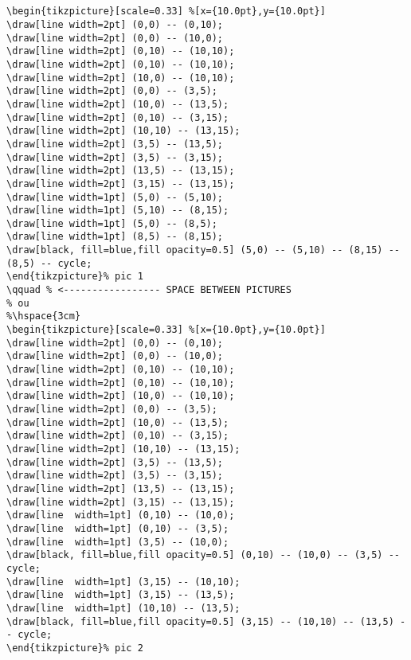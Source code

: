 \begin{lstlisting}[style=myLaTeX,caption=A cube with fixed 2d Coordinates]


\begin{tikzpicture}[scale=0.33] %[x={10.0pt},y={10.0pt}]
\draw[line width=2pt] (0,0) -- (0,10);
\draw[line width=2pt] (0,0) -- (10,0);
\draw[line width=2pt] (0,10) -- (10,10);
\draw[line width=2pt] (0,10) -- (10,10);
\draw[line width=2pt] (10,0) -- (10,10);
\draw[line width=2pt] (0,0) -- (3,5);
\draw[line width=2pt] (10,0) -- (13,5);
\draw[line width=2pt] (0,10) -- (3,15);
\draw[line width=2pt] (10,10) -- (13,15);
\draw[line width=2pt] (3,5) -- (13,5);
\draw[line width=2pt] (3,5) -- (3,15);
\draw[line width=2pt] (13,5) -- (13,15);
\draw[line width=2pt] (3,15) -- (13,15);
\draw[line width=1pt] (5,0) -- (5,10);
\draw[line width=1pt] (5,10) -- (8,15);
\draw[line width=1pt] (5,0) -- (8,5);
\draw[line width=1pt] (8,5) -- (8,15);
\draw[black, fill=blue,fill opacity=0.5] (5,0) -- (5,10) -- (8,15) -- (8,5) -- cycle;
\end{tikzpicture}% pic 1
\qquad % <----------------- SPACE BETWEEN PICTURES
% ou
%\hspace{3cm}
\begin{tikzpicture}[scale=0.33] %[x={10.0pt},y={10.0pt}]
\draw[line width=2pt] (0,0) -- (0,10);
\draw[line width=2pt] (0,0) -- (10,0);
\draw[line width=2pt] (0,10) -- (10,10);
\draw[line width=2pt] (0,10) -- (10,10);
\draw[line width=2pt] (10,0) -- (10,10);
\draw[line width=2pt] (0,0) -- (3,5);
\draw[line width=2pt] (10,0) -- (13,5);
\draw[line width=2pt] (0,10) -- (3,15);
\draw[line width=2pt] (10,10) -- (13,15);
\draw[line width=2pt] (3,5) -- (13,5);
\draw[line width=2pt] (3,5) -- (3,15);
\draw[line width=2pt] (13,5) -- (13,15);
\draw[line width=2pt] (3,15) -- (13,15);
\draw[line  width=1pt] (0,10) -- (10,0);
\draw[line  width=1pt] (0,10) -- (3,5);
\draw[line  width=1pt] (3,5) -- (10,0);
\draw[black, fill=blue,fill opacity=0.5] (0,10) -- (10,0) -- (3,5) -- cycle;
\draw[line  width=1pt] (3,15) -- (10,10);
\draw[line  width=1pt] (3,15) -- (13,5);
\draw[line  width=1pt] (10,10) -- (13,5);
\draw[black, fill=blue,fill opacity=0.5] (3,15) -- (10,10) -- (13,5) -- cycle;
\end{tikzpicture}% pic 2
\end{lstlisting}


